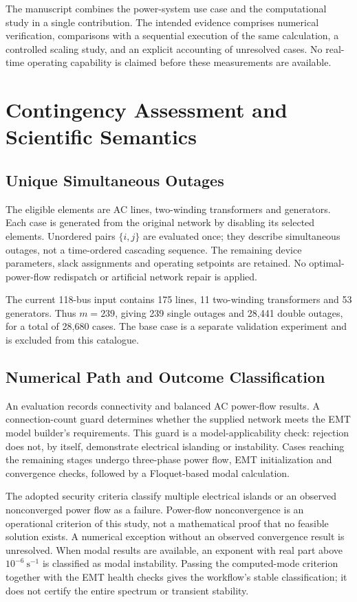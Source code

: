 \documentclass[journal]{IEEEtran}
\begin{document}
The manuscript combines the power-system use case and the computational study in a single contribution. The intended evidence comprises numerical verification, comparisons with a sequential execution of the same calculation, a controlled scaling study, and an explicit accounting of unresolved cases. No real-time operating capability is claimed before these measurements are available.

\section{Contingency Assessment and Scientific Semantics}
\label{sec:method}
\subsection{Unique Simultaneous Outages}
The eligible elements are AC lines, two-winding transformers and generators. Each case is generated from the original network by disabling its selected elements. Unordered pairs $\{i,j\}$ are evaluated once; they describe simultaneous outages, not a time-ordered cascading sequence. The remaining device parameters, slack assignments and operating setpoints are retained. No optimal-power-flow redispatch or artificial network repair is applied.

The current 118-bus input contains 175 lines, 11 two-winding transformers and 53 generators. Thus $m=239$, giving 239 single outages and 28,441 double outages, for a total of 28,680 cases. The base case is a separate validation experiment and is excluded from this catalogue.

\subsection{Numerical Path and Outcome Classification}
An evaluation records connectivity and balanced AC power-flow results. A connection-count guard determines whether the supplied network meets the EMT model builder's requirements. This guard is a model-applicability check: rejection does not, by itself, demonstrate electrical islanding or instability. Cases reaching the remaining stages undergo three-phase power flow, EMT initialization and convergence checks, followed by a Floquet-based modal calculation.

The adopted security criteria classify multiple electrical islands or an observed nonconverged power flow as a failure. Power-flow nonconvergence is an operational criterion of this study, not a mathematical proof that no feasible solution exists. A numerical exception without an observed convergence result is unresolved. When modal results are available, an exponent with real part above $10^{-6}\ \mathrm{s}^{-1}$ is classified as modal instability. Passing the computed-mode criterion together with the EMT health checks gives the workflow's stable classification; it does not certify the entire spectrum or transient stability.
\end{document}
